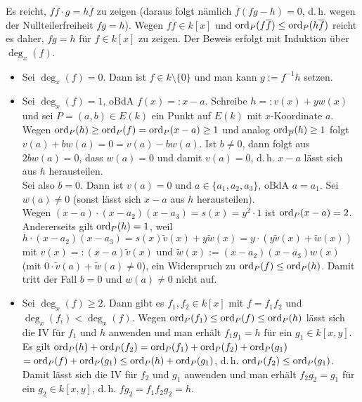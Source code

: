 \begin{Beweis}
    Es reicht, $f\overline{f} \cdot g = h\overline{f}$ zu zeigen
    (daraus folgt nämlich $\overline{f} (fg - h) = 0$, d.\,h. wegen der Nullteilerfreiheit
    $fg = h$).
    Wegen $f\overline{f} \in k[x]$ und $\operatorname{ord}_P(f\overline{f}) \le \operatorname{ord}_P(h \overline{f})$
    reicht es daher, $fg = h$ für $f \in k[x]$ zu zeigen.
    Der Beweis erfolgt mit Induktion über $\deg_x(f)$.
    \begin{itemize}
        \item
        Sei $\deg_x(f) = 0$.
        Dann ist $f \in k \setminus \{0\}$ und man kann $g := f^{-1} h$ setzen.
        
        \item
        Sei $\deg_x(f) = 1$, oBdA $f(x) =: x - a$.
        Schreibe $h =: v(x) + yw(x)$ und sei $P = (a, b) \in E(k)$ ein Punkt auf $E(k)$ mit
        $x$-Koordinate $a$.
        Wegen $\operatorname{ord}_P(h) \ge \operatorname{ord}_P(f) = \operatorname{ord}_P(x - a) \ge 1$ und analog
        $\operatorname{ord}_{\overline{P}}(h) \ge 1$ folgt $v(a) + bw(a) = 0 = v(a) - bw(a)$.
        Ist $b \not= 0$, dann folgt aus $2bw(a) = 0$, dass $w(a) = 0$ und damit $v(a) = 0$,
        d.\,h. $x - a$ lässt sich aus $h$ herausteilen.\\
        Sei also $b = 0$.
        Dann ist $v(a) = 0$ und $a \in \{a_1, a_2, a_3\}$, oBdA $a = a_1$.
        Sei $w(a) \not= 0$ (sonst lässt sich $x - a$ aus $h$ herausteilen).\\
        Wegen $(x - a) \cdot (x - a_2)(x - a_3) = s(x) = y^2 \cdot 1$ ist $\operatorname{ord}_P(x - a) = 2$.\\
        Andererseits gilt $\operatorname{ord}_P(h) = 1$,
        weil $h \cdot (x - a_2)(x - a_3) = s(x) \widetilde{v}(x) + y \widetilde{w}(x)
        = y \cdot (y \widetilde{v}(x) + \widetilde{w}(x))$
        mit $v(x) =: (x - a) \widetilde{v}(x)$ und $\widetilde{w}(x) := (x - a_2) (x - a_3) w(x)$
        (mit $0 \cdot \widetilde{v}(a) + \widetilde{w}(a) \not= 0$),
        ein Widerspruch zu $\operatorname{ord}_P(f) \le \operatorname{ord}_P(h)$.
        Damit tritt der Fall $b = 0$ und $w(a) \not= 0$ nicht auf.
        
        \item
        Sei $\deg_x(f) \ge 2$.
        Dann gibt es $f_1, f_2 \in k[x]$ mit $f = f_1 f_2$ und $\deg_x(f_i) < \deg_x(f)$.
        Wegen $\operatorname{ord}_P(f_1) \le \operatorname{ord}_P(f) \le \operatorname{ord}_P(h)$ lässt sich die IV
        für $f_1$ und $h$ anwenden und man erhält $f_1 g_1 = h$ für ein $g_1 \in k[x, y]$.
        Es gilt
        $\operatorname{ord}_P(h) + \operatorname{ord}_P(f_2) = \operatorname{ord}_P(f_1) + \operatorname{ord}_P(f_2) + \operatorname{ord}_P(g_1)$\\
        $= \operatorname{ord}_P(f) + \operatorname{ord}_P(g_1) \le \operatorname{ord}_P(h) + \operatorname{ord}_P(g_1)$,
        d.\,h. $\operatorname{ord}_P(f_2) \le \operatorname{ord}_P(g_1)$.
        Damit lässt sich die IV für $f_2$
        und $g_1$ anwenden und man erhält $f_2 g_2 = g_1$ für ein $g_2 \in k[x, y]$,
        d.\,h. $fg_2 = f_1 f_2 g_2 = h$.
        \vspace{-7mm}
    \end{itemize}
\end{Beweis}

